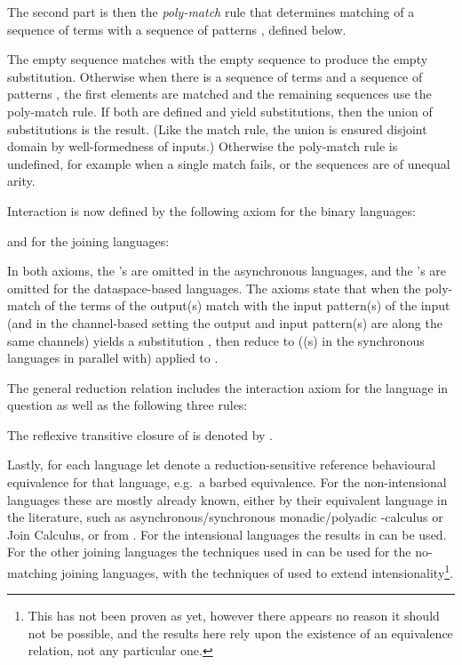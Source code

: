 \documentclass[submission,copyright,creativecommons]{eptcs}
\begin{document}
The second part is then the {\em poly-match} rule  that
determines matching of a sequence of terms  with a sequence of patterns ,
defined below.

The empty sequence matches with the empty sequence to produce the empty substitution.
Otherwise when there is a sequence of terms  and a sequence of patterns ,
the first elements are matched  and the remaining sequences use the poly-match rule.
If both are defined and yield substitutions, then the union of substitutions is the
result.
(Like the match rule, the union is ensured disjoint domain by well-formedness of inputs.)
Otherwise the poly-match rule is undefined, for example when a single match fails, or the
sequences are of unequal arity.

Interaction is now defined by the following axiom for the binary languages:

and for the joining languages:

In both axioms, the 's are omitted in the asynchronous languages,
and the 's are omitted for the dataspace-based languages.
The axioms state that when the poly-match of the terms of the output(s)  match with the
input pattern(s) of the input  (and in the channel-based setting the output and input pattern(s)
are along the same channels) yields a substitution , then reduce to ((s) in the synchronous languages
in parallel with)  applied to .

The general reduction relation  includes the interaction axiom for the language in question
as well as the following three rules:

The reflexive transitive closure of  is denoted by .

Lastly, for each language let  denote
a reduction-sensitive reference behavioural equivalence for that language, e.g.~a barbed equivalence.
For the non-intensional languages these are mostly already known, either by
their equivalent language in the literature, such as asynchronous/synchronous monadic/polyadic
-calculus or Join Calculus, or from \cite{G:IC08}.
For the intensional languages the results in \cite{GivenWilsonGorla13} can be used.
For the other joining languages the techniques used in \cite{Fournet99bisimulationsin} can be used for
the no-matching joining languages, with the techniques of \cite{GivenWilsonGorla13} used to extend
intensionality\footnote{This has not been proven as yet, however there appears no reason it should not be
possible, and the results here rely upon the existence of an equivalence relation, not any particular one.}.
\end{document}
